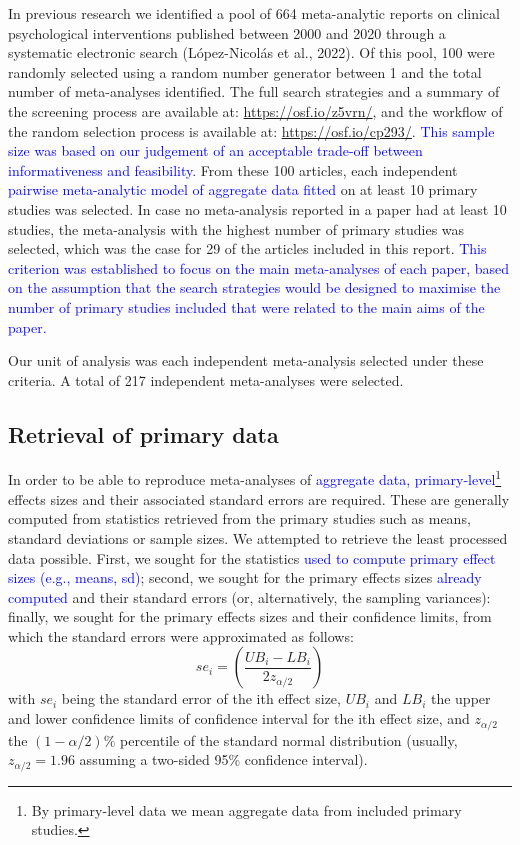 \documentclass[
  ,man,floatsintext]{apa6}
\begin{document}
In previous research we identified a pool of 664 meta-analytic reports on clinical psychological interventions published between 2000 and 2020 through a systematic electronic search (López-Nicolás et al., 2022). Of this pool, 100 were randomly selected using a random number generator between 1 and the total number of meta-analyses identified. The full search strategies and a summary of the screening process are available at: \url{https://osf.io/z5vrn/}, and the workflow of the random selection process is available at: \url{https://osf.io/cp293/}. \textcolor{blue}{This sample size was based on our judgement of an acceptable trade-off between informativeness and feasibility.}
From these 100 articles, each independent \textcolor{blue} {pairwise meta-analytic model of aggregate data fitted} on at least 10 primary studies was selected. In case no meta-analysis reported in a paper had at least 10 studies, the meta-analysis with the highest number of primary studies was selected, which was the case for 29 of the articles included in this report. \textcolor{blue}{This criterion was established to focus on the main meta-analyses of each paper, based on the assumption that the search strategies would be designed to maximise the number of primary studies included that were related to the main aims of the paper.}

Our unit of analysis was each independent meta-analysis selected under these criteria. A total of 217 independent meta-analyses were selected.

\hypertarget{retrieval-of-primary-data}{%
\subsection{Retrieval of primary data}\label{retrieval-of-primary-data}}

In order to be able to reproduce meta-analyses of \textcolor{blue}{aggregate data, primary-level}\footnote{By primary-level data we mean aggregate data from included primary studies.} effects sizes and their associated standard errors are required. These are generally computed from statistics retrieved from the primary studies such as means, standard deviations or sample sizes. We attempted to retrieve the least processed data possible. First, we sought for the statistics \textcolor{blue}{used to compute primary effect sizes (e.g., means, sd)}; second, we sought for the primary effects sizes \textcolor{blue}{already computed} and their standard errors (or, alternatively, the sampling variances): finally, we sought for the primary effects sizes and their confidence limits, from which the standard errors were approximated as follows:
\[se_i = (\frac{UB_i - LB_i}{2z_{\alpha/2}})\]
with \(se_i\) being the standard error of the ith effect size, \(UB_i\) and \(LB_i\) the upper and lower confidence limits of confidence interval for the ith effect size, and \(z_{\alpha/2}\) the \((1 - {\alpha/2})\%\) percentile of the standard normal distribution (usually, \(z_{\alpha/2} = 1.96\) assuming a two-sided 95\% confidence interval).
\end{document}
